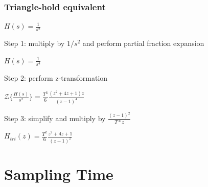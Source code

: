 \begin{frame}
	\frametitle{Triangle-hold equivalent}
	\begin{example}
		\begin{center}
			$H(s) = \frac{1}{s^{2}}$
		\end{center}
		Step 1: multiply by $1/s^{2}$ and perform partial fraction expansion
		\begin{center}
			$H(s) = \frac{1}{s^{4}}$
		\end{center}
		Step 2: perform z-transformation
		\begin{center}
			$\mathcal{Z}\{\frac{H(s)}{s^{2}}\} = \frac{T^{3}}{6} \frac{(z^{2} + 4z +1) z}{(z-1)^{4}}$
		\end{center}
		Step 3: simplify and multiply by $\frac{(z-1)^{2}}{T*z}$
		\begin{center}
			$H_{tri}(z) = \frac{T^{2}}{6} \frac{z^{2} + 4z + 1}{(z-1)^{2}}$
		\end{center}
	\end{example}
\end{frame}

\section{Sampling Time}


